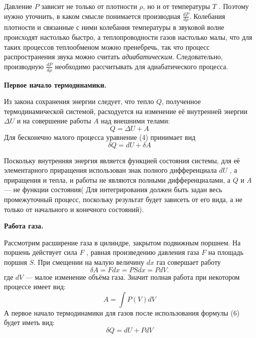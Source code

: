 \documentclass[10pt]{article}
\begin{document}
    Давление $P$ зависит не только от плотности $\rho$, но и от температуры $T$ . Поэтому нужно уточнить, в каком смысле понимается производная $\frac{dP}{d\rho}$.
    Колебания плотности и связанные с ними колебания температуры в звуковой волне происходят настолько быстро, а теплопроводности газов настолько малы, что для таких процессов теплообменом можно пренебречь, так что процесс распространения звука можно считать \textit{адиабатическим}. Следовательно, производную $\frac{dP}{d\rho}$ необходимо рассчитывать для адиабатического процесса.


    \textbf{ Первое начало термодинамики.}

    Из закона сохранения энергии следует, что тепло $Q$, полученное термодинамической системой, расходуется на изменение её внутренней энергии $\Delta U$ и на совершение работы $A$ над внешними телами:
    \begin{equation}
        Q = \Delta U + A
    \end{equation}
    Для бесконечно малого процесса уравнение (4) принимает вид 
    \begin{equation}
        \delta Q = dU + \delta A
    \end{equation}

    Поскольку внутренняя энергия является функцией состояния системы, для её элементарного приращения использован знак полного дифференциала $dU$ , а приращения и тепла, и работы не являются полными дифференциалами, а $Q$ и $A$ — не функции состояния(
    Для интегрирования должен быть задан весь промежуточный процесс, поскольку результат будет зависеть от его вида, а не только от начального и конечного состояний).

    \textbf{ Работа газа.}

    Рассмотрим расширение газа в цилиндре, закрытом подвижным поршнем. На поршень действует сила $F$ , равная произведению давления газа $F$ на площадь поршня $S$. При смещении на малую величину $dx$ газ совершает работу
    \begin{equation}
        \delta A = F dx = P S dx = P dV.
    \end{equation}
    где $dV$  — малое изменение объёма газа.
    Значит полная работа при некотором процессе имеет вид:
    \begin{equation}
        A = \int P(V) dV
    \end{equation}
    А первое начало термодинамики для газов после использования формулы (6) будет иметь вид:
    \begin{equation}
        \delta Q = dU + P dV
    \end{equation}
\end{document}
